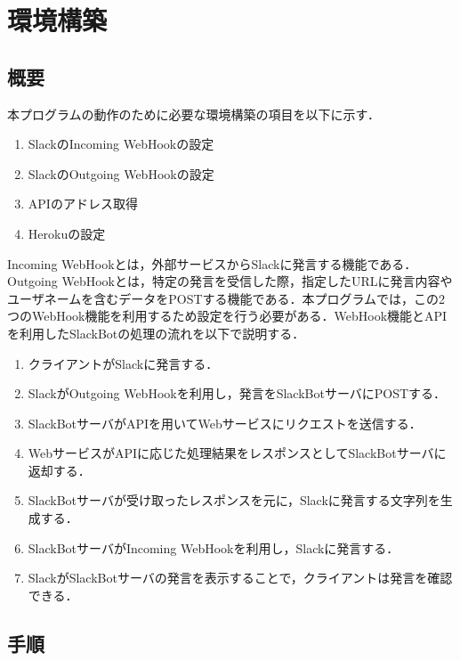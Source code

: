 \documentclass[12pt]{jsarticle}
\begin{document}
\section{環境構築}
\subsection{概要}
本プログラムの動作のために必要な環境構築の項目を以下に示す．
\begin{enumerate}
\item SlackのIncoming WebHookの設定
\item SlackのOutgoing WebHookの設定
\item APIのアドレス取得
\item Herokuの設定
\end{enumerate}
Incoming WebHookとは，外部サービスからSlackに発言する機能である．Outgoing WebHookとは，特定の発言を受信した際，指定したURLに発言内容やユーザネームを含むデータをPOSTする機能である．本プログラムでは，この2つのWebHook機能を利用するため設定を行う必要がある．WebHook機能とAPIを利用したSlackBotの処理の流れを以下で説明する．

\begin{enumerate}
\item クライアントがSlackに発言する．
\item SlackがOutgoing WebHookを利用し，発言をSlackBotサーバにPOSTする．
\item SlackBotサーバがAPIを用いてWebサービスにリクエストを送信する．
\item WebサービスがAPIに応じた処理結果をレスポンスとしてSlackBotサーバに返却する．
\item SlackBotサーバが受け取ったレスポンスを元に，Slackに発言する文字列を生成する．
\item SlackBotサーバがIncoming WebHookを利用し，Slackに発言する．
\item SlackがSlackBotサーバの発言を表示することで，クライアントは発言を確認できる．
\end{enumerate}


\subsection{手順}
\end{document}

